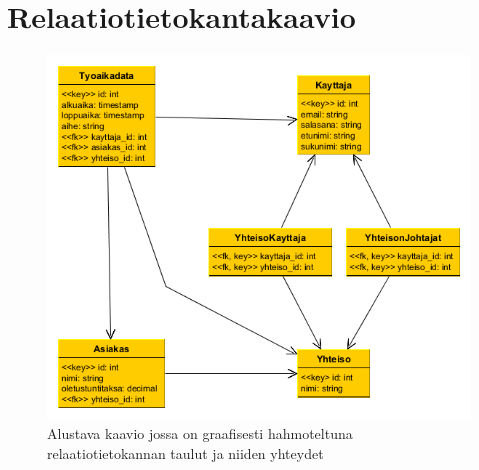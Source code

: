 \documentclass[a4paper, 12pt finnish]{article}
\begin{document}
\newpage
\section{Relaatiotietokantakaavio}
\begin{figure}[h]
    \centering
    \includegraphics[width=1\textwidth]{relaatiokaavio.png}
    \caption{\small Alustava kaavio jossa on graafisesti hahmoteltuna
    relaatiotietokannan taulut ja niiden yhteydet}
\end{figure}
\end{document}
